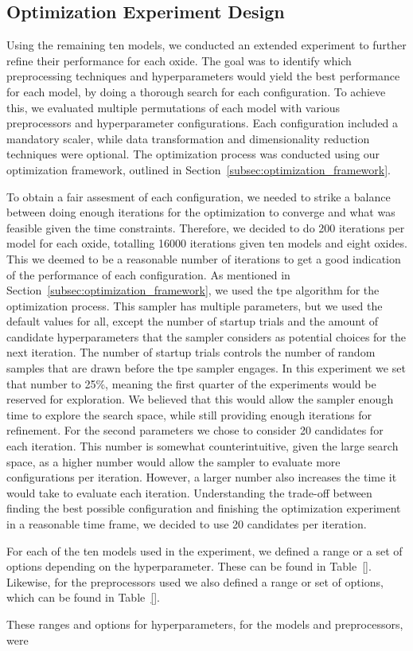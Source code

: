 \subsection{Optimization Experiment Design}\label{subsec:optimization_experiment_design}
Using the remaining ten models, we conducted an extended experiment to further refine their performance for each oxide. 
The goal was to identify which preprocessing techniques and hyperparameters would yield the best performance for each model, by doing a thorough search for each configuration.
To achieve this, we evaluated multiple permutations of each model with various preprocessors and hyperparameter configurations. 
Each configuration included a mandatory scaler, while data transformation and dimensionality reduction techniques were optional.
The optimization process was conducted using our optimization framework, outlined in Section~\ref{subsec:optimization_framework}.

To obtain a fair assesment of each configuration, we needed to strike a balance between doing enough iterations for the optimization to converge and what was feasible given the time constraints.
Therefore, we decided to do 200 iterations per model for each oxide, totalling 16000 iterations given ten models and eight oxides. 
This we deemed to be a reasonable number of iterations to get a good indication of the performance of each configuration.
As mentioned in Section~\ref{subsec:optimization_framework}, we used the \gls{tpe} algorithm for the optimization process.
This sampler has multiple parameters, but we used the default values for all, except the number of startup trials and the amount of candidate hyperparameters that the sampler considers as potential choices for the next iteration.
The number of startup trials controls the number of random samples that are drawn before the \gls{tpe} sampler engages.
In this experiment we set that number to 25\%, meaning the first quarter of the experiments would be reserved for exploration.
We believed that this would allow the sampler enough time to explore the search space, while still providing enough iterations for refinement.
For the second parameters we chose to consider 20 candidates for each iteration.
This number is somewhat counterintuitive, given the large search space, as a higher number would allow the sampler to evaluate more configurations per iteration.
However, a larger number also increases the time it would take to evaluate each iteration.
Understanding the trade-off between finding the best possible configuration and finishing the optimization experiment in a reasonable time frame, we decided to use 20 candidates per iteration.

For each of the ten models used in the experiment, we defined a range or a set of options depending on the hyperparameter.
These can be found in Table~\ref{}.
Likewise, for the preprocessors used we also defined a range or set of options, which can be found in Table~\ref{}.


These ranges and options for hyperparameters, for the models and preprocessors, were   